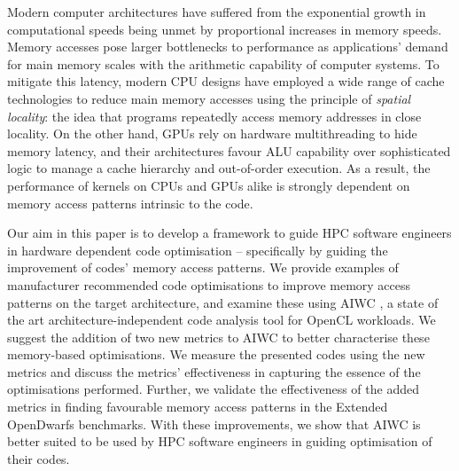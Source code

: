 \documentclass[review=false, sigchi]{acmart}
\begin{document}
	Modern computer architectures have suffered from the exponential growth in computational speeds being unmet by proportional increases in memory speeds\cite{hennessycomparch}. Memory accesses pose larger bottlenecks to performance as applications' demand for main memory scales with the arithmetic capability of computer systems. To mitigate this latency, modern CPU designs have employed a wide range of cache technologies to reduce main memory accesses using the principle of \emph{spatial locality}: the idea that programs repeatedly access memory addresses in close locality. On the other hand, GPUs rely on hardware multithreading to hide memory latency, and their architectures favour ALU capability over sophisticated logic to manage a cache hierarchy and out-of-order execution. As a result, the performance of kernels on CPUs and GPUs alike is strongly dependent on memory access patterns intrinsic to the code. %
	
	
	
	Our aim in this paper is to develop a framework to guide HPC software engineers in hardware dependent code optimisation -- specifically by guiding the improvement of codes' memory access patterns. %
	We provide examples of manufacturer recommended code optimisations to improve memory access patterns on the target architecture, and examine these using AIWC \cite{beauaiwc}, a state of the art architecture-independent code analysis tool for OpenCL workloads.
	We suggest the addition of two new metrics to AIWC to better characterise these memory-based optimisations.
	We measure the presented codes using the new metrics and discuss the metrics' effectiveness in capturing the essence of the optimisations performed.
	Further, we validate the effectiveness of the added metrics in finding favourable memory access patterns in the Extended OpenDwarfs benchmarks.
	With these improvements, we show that AIWC is better suited to be used by HPC software engineers in guiding optimisation of their codes. 
	
\end{document}
